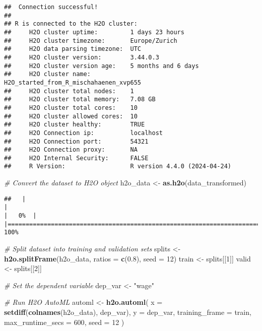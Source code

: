 \documentclass[
]{article}
\newenvironment{Shaded}{\begin{snugshade}}{\end{snugshade}}
\newcommand{\AttributeTok}[1]{\textcolor[rgb]{0.13,0.29,0.53}{#1}}
\newcommand{\CommentTok}[1]{\textcolor[rgb]{0.56,0.35,0.01}{\textit{#1}}}
\newcommand{\DecValTok}[1]{\textcolor[rgb]{0.00,0.00,0.81}{#1}}
\newcommand{\FloatTok}[1]{\textcolor[rgb]{0.00,0.00,0.81}{#1}}
\newcommand{\FunctionTok}[1]{\textcolor[rgb]{0.13,0.29,0.53}{\textbf{#1}}}
\newcommand{\NormalTok}[1]{#1}
\newcommand{\OtherTok}[1]{\textcolor[rgb]{0.56,0.35,0.01}{#1}}
\newcommand{\StringTok}[1]{\textcolor[rgb]{0.31,0.60,0.02}{#1}}
\begin{document}
\begin{verbatim}
##  Connection successful!
## 
## R is connected to the H2O cluster: 
##     H2O cluster uptime:         1 days 23 hours 
##     H2O cluster timezone:       Europe/Zurich 
##     H2O data parsing timezone:  UTC 
##     H2O cluster version:        3.44.0.3 
##     H2O cluster version age:    5 months and 6 days 
##     H2O cluster name:           H2O_started_from_R_mischahaenen_xvp655 
##     H2O cluster total nodes:    1 
##     H2O cluster total memory:   7.08 GB 
##     H2O cluster total cores:    10 
##     H2O cluster allowed cores:  10 
##     H2O cluster healthy:        TRUE 
##     H2O Connection ip:          localhost 
##     H2O Connection port:        54321 
##     H2O Connection proxy:       NA 
##     H2O Internal Security:      FALSE 
##     R Version:                  R version 4.4.0 (2024-04-24)
\end{verbatim}

\begin{Shaded}
\begin{Highlighting}[]
\CommentTok{\# Convert the dataset to H2O object}
\NormalTok{h2o\_data }\OtherTok{\textless{}{-}} \FunctionTok{as.h2o}\NormalTok{(data\_transformed)}
\end{Highlighting}
\end{Shaded}

\begin{verbatim}
##   |                                                                              |                                                                      |   0%  |                                                                              |======================================================================| 100%
\end{verbatim}

\begin{Shaded}
\begin{Highlighting}[]
\CommentTok{\# Split dataset into training and validation sets}
\NormalTok{splits }\OtherTok{\textless{}{-}} \FunctionTok{h2o.splitFrame}\NormalTok{(h2o\_data, }\AttributeTok{ratios =} \FunctionTok{c}\NormalTok{(}\FloatTok{0.8}\NormalTok{), }\AttributeTok{seed =} \DecValTok{12}\NormalTok{)}
\NormalTok{train }\OtherTok{\textless{}{-}}\NormalTok{ splits[[}\DecValTok{1}\NormalTok{]]}
\NormalTok{valid }\OtherTok{\textless{}{-}}\NormalTok{ splits[[}\DecValTok{2}\NormalTok{]]}

\CommentTok{\# Set the dependent variable}
\NormalTok{dep\_var }\OtherTok{\textless{}{-}} \StringTok{"wage"}

\CommentTok{\# Run H2O AutoML}
\NormalTok{automl }\OtherTok{\textless{}{-}} \FunctionTok{h2o.automl}\NormalTok{(}
  \AttributeTok{x =} \FunctionTok{setdiff}\NormalTok{(}\FunctionTok{colnames}\NormalTok{(h2o\_data), dep\_var),}
  \AttributeTok{y =}\NormalTok{ dep\_var,}
  \AttributeTok{training\_frame =}\NormalTok{ train,}
  \AttributeTok{max\_runtime\_secs =} \DecValTok{600}\NormalTok{,}
  \AttributeTok{seed =} \DecValTok{12}
\NormalTok{)}
\end{Highlighting}
\end{Shaded}
\end{document}
